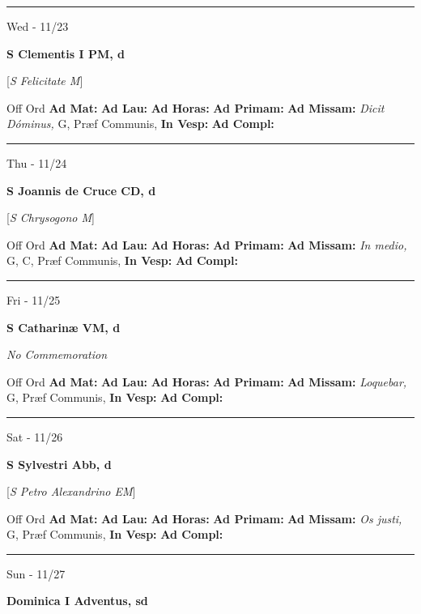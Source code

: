 \documentclass[letterpaper, 10pt]{article}
\begin{document}
\hrule
\begin{center}
Wed - 11/23
\end{center}\textbf{ \large S Clementis I PM, \textnormal{\normalsize d}}

[\textit{S Felicitate M}]
\begin{justify}
Off Ord
\textbf{Ad Mat: }
\textbf{Ad Lau: }
\textbf{Ad Horas: }
\textbf{Ad Primam: }
\textbf{Ad Missam:} \textit{Dicit Dóminus, } G, Præf Communis, 
\textbf{In Vesp: }
\textbf{Ad Compl: }\end{justify}



\hrule
\begin{center}
Thu - 11/24
\end{center}\textbf{ \large S Joannis de Cruce CD, \textnormal{\normalsize d}}

[\textit{S Chrysogono M}]
\begin{justify}
Off Ord
\textbf{Ad Mat: }
\textbf{Ad Lau: }
\textbf{Ad Horas: }
\textbf{Ad Primam: }
\textbf{Ad Missam:} \textit{In medio, } G, C, Præf Communis, 
\textbf{In Vesp: }
\textbf{Ad Compl: }\end{justify}



\hrule
\begin{center}
Fri - 11/25
\end{center}\textbf{ \large S Catharinæ VM, \textnormal{\normalsize d}}

\textit{No Commemoration}\begin{justify}
Off Ord
\textbf{Ad Mat: }
\textbf{Ad Lau: }
\textbf{Ad Horas: }
\textbf{Ad Primam: }
\textbf{Ad Missam:} \textit{Loquebar, } G, Præf Communis, 
\textbf{In Vesp: }
\textbf{Ad Compl: }\end{justify}



\hrule
\begin{center}
Sat - 11/26
\end{center}\textbf{ \large S Sylvestri Abb, \textnormal{\normalsize d}}

[\textit{S Petro Alexandrino EM}]
\begin{justify}
Off Ord
\textbf{Ad Mat: }
\textbf{Ad Lau: }
\textbf{Ad Horas: }
\textbf{Ad Primam: }
\textbf{Ad Missam:} \textit{Os justi, } G, Præf Communis, 
\textbf{In Vesp: }
\textbf{Ad Compl: }\end{justify}



\hrule
\begin{center}
Sun - 11/27
\end{center}\textbf{ \large Dominica I Adventus, \textnormal{\normalsize sd}}
\end{document}
